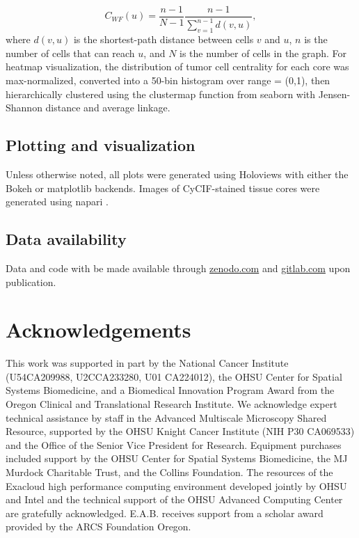 \documentclass[preprint,review,3p,12pt]{elsarticle}
\begin{document}
\begin{equation}
\label{eq:cc}
C_{WF}(u) = \frac{n-1}{N-1} \frac{n - 1}{\sum_{v=1}^{n-1} d(v, u)},
\end{equation}
where $d(v,u)$ is the shortest-path distance between cells $v$ and $u$, $n$ is the number of cells that can reach $u$, and $N$ is the number of cells in the graph. For heatmap visualization, the distribution of tumor cell centrality for each core was max-normalized, converted into a 50-bin histogram over range = (0,1), then hierarchically clustered using the clustermap function from seaborn \cite{seaborn2020} with Jensen-Shannon distance and average linkage.

\subsection{Plotting and visualization}
Unless otherwise noted, all plots were generated using Holoviews \cite{holoviews1_12_7} with either the Bokeh \cite{bokeh2020} or matplotlib \cite{mpl2007} backends. Images of CyCIF-stained tissue cores were generated using napari \cite{napari_0_3_0}.

\subsection{Data availability}
Data and code with be made available through \url{zenodo.com} and \url{gitlab.com} upon publication.

\section{Acknowledgements}
This work was supported in part by the National Cancer Institute (U54CA209988, U2CCA233280, U01 CA224012), the OHSU Center for Spatial Systems Biomedicine, and a Biomedical Innovation Program Award from the Oregon Clinical and Translational Research Institute. We acknowledge expert technical assistance by staff in the Advanced Multiscale Microscopy Shared Resource, supported by the OHSU Knight Cancer Institute (NIH P30 CA069533) and the Office of the Senior Vice President for Research. Equipment purchases included support by the OHSU Center for Spatial Systems Biomedicine, the MJ Murdock Charitable Trust, and the Collins Foundation. The resources of the Exacloud high performance computing environment developed jointly by OHSU and Intel and the technical support of the OHSU Advanced Computing Center are gratefully acknowledged. E.A.B. receives support from a scholar award provided by the ARCS Foundation Oregon.
\end{document}
